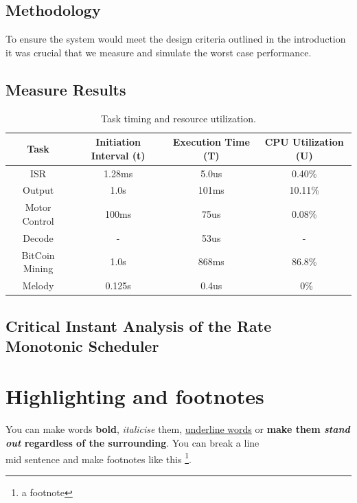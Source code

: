 \documentclass{article}
\begin{document}
\subsection{Methodology}
To ensure the system would meet the design criteria outlined in the introduction it was crucial that we measure and simulate the worst case performance. 

\subsection{Measure Results}

\begin{table}[ht]
\centering                      %
\begin{tabular}{c c c c}        %
Task & Initiation Interval (t) & Execution Time (T) & CPU Utilization (U) \\ [0.5ex]   %
\hline                          %
ISR & 1.28ms & 5.0us & 0.40\% \\           %
Output & 1.0s & 101ms & 10.11\% \\                         
Motor Control & 100ms & 75us  & 0.08\% \\
Decode & - & 53us & - \\
BitCoin Mining & 1.0s & 868ms & 86.8\% \\
Melody & 0.125s & 0.4us & ~0\% \\[1ex]     %
\end{tabular}
\caption{Task timing and resource utilization.} 
\label{table:nonlin}            %
\end{table}


\subsection{Critical Instant Analysis of the Rate Monotonic Scheduler}









\section{Highlighting and footnotes}
You can make words \textbf{bold}, \textit{italicise} them, \underline{underline words} or \textbf{make them \emph{stand out} regardless of the surrounding}. You can break a line\\ mid sentence and make footnotes like this \footnote{a footnote}.
\end{document}
